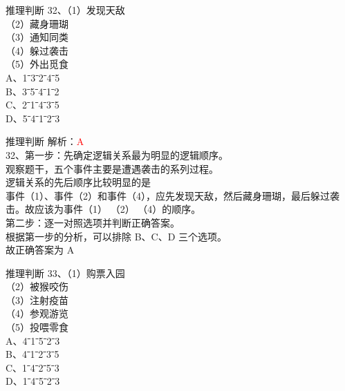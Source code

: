\documentclass[aspectratio=169]{beamer}
\begin{document}
\begin{frame}[t]{推理判断}
    32、（1）发现天敌\\
    （2）藏身珊瑚\\
    （3）通知同类\\
    （4）躲过袭击\\
    （5）外出觅食\\
    A、1ˉ3ˉ2ˉ4ˉ5\\
    B、3ˉ5ˉ4ˉ1ˉ2\\
    C、2ˉ1ˉ4ˉ3ˉ5\\
    D、5ˉ4ˉ1ˉ2ˉ3\\
\end{frame}


\begin{frame}[t]{推理判断}
    解析：\textcolor{red}{A}\\
    32、第一步：先确定逻辑关系最为明显的逻辑顺序。\\
    观察题干，五个事件主要是遭遇袭击的系列过程。\\
    逻辑关系的先后顺序比较明显的是\\
    事件（1）、事件（2）和事件（4），应先发现天敌，然后藏身珊瑚，最后躲过袭击。故应该为事件（1） （2） （4）的顺序。\\
    第二步：逐一对照选项并判断正确答案。\\
    根据第一步的分析，可以排除 B、C、D 三个选项。\\
    故正确答案为 A\\
\end{frame}



\begin{frame}[t]{推理判断}
    33、（1）购票入园\\
    （2）被猴咬伤\\
    （3）注射疫苗\\
    （4）参观游览\\
    （5）投喂零食\\
    A、4ˉ1ˉ5ˉ2ˉ3\\
    B、4ˉ1ˉ2ˉ3ˉ5\\
    C、1ˉ4ˉ2ˉ5ˉ3\\
    D、1ˉ4ˉ5ˉ2ˉ3\\
\end{frame}
\end{document}
